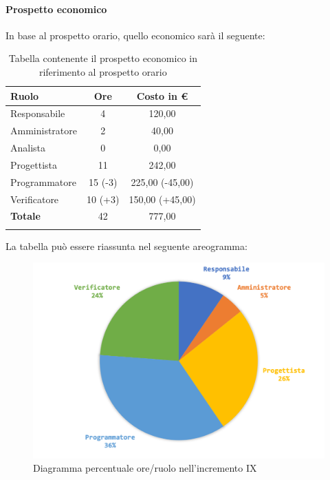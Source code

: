 		
		\paragraph{Prospetto economico}
			In base al prospetto orario, quello economico sarà il seguente: 
		
		\begin{longtable}{|l|c|c|}
			\hline
			\rowcolor{lighter-grayer}
			\textbf{Ruolo} & \textbf{Ore} & \textbf{Costo in € } \\
			\hline
			\endfirsthead
			
			\hline
			Responsabile 	    & 4 & 120,00\\
			\hline 
			\hline
			Amministratore	   & 2 & 40,00\\
			\hline
			\hline
			Analista 				& 0 & 0,00\\
			\hline
			\hline
			Progettista 		   & 11 & 242,00\\
			\hline
			\hline
			Programmatore 	  & 15 (-3) & 225,00 (-45,00)\\
			\hline
			\hline
			Verificatore 		   & 10 (+3) & 150,00 (+45,00)\\
			\hline
			\textbf{Totale} 	 & 42 & 777,00\\
			\hline
			\caption{Tabella contenente il prospetto economico in riferimento al prospetto orario}
		\end{longtable}
		
		La tabella può essere riassunta nel seguente areogramma:
		\begin{figure}[H]
			\centering
			\includegraphics[width=0.8\linewidth]{images/consuntivo/ConsIncr9-2.png}
			\caption{Diagramma percentuale ore/ruolo nell'incremento IX}
			\label{fig:consuntivo diagramma costi ruolo incremento IX}
		\end{figure}
		\pagebreak
